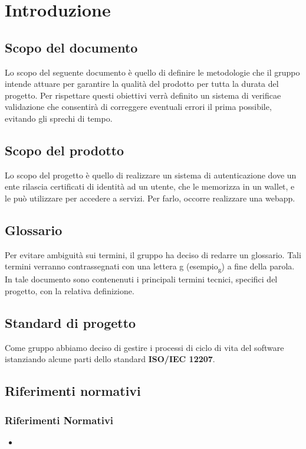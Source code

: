 \section{Introduzione}
\subsection{Scopo del documento}
Lo scopo del seguente documento è quello di definire le metodologie che il gruppo intende attuare per garantire la qualità del prodotto per tutta la durata del progetto.
Per rispettare questi obiettivi verrà definito un sistema di verifica\glo e validazione che consentirà di correggere eventuali errori il prima possibile, evitando gli sprechi di tempo.
\subsection{Scopo del prodotto} %
Lo scopo del progetto è quello di realizzare un sistema di autenticazione dove un ente rilascia
certificati di identità ad un utente, che le memorizza in un wallet\glo, e le può utilizzare
per accedere a servizi. Per farlo, occorre realizzare una webapp.
\subsection{Glossario}
Per evitare ambiguità sui termini, il gruppo ha deciso di redarre un glossario. Tali termini verranno contrassegnati con una lettera g (esempio\textsubscript{g}) a fine della parola. In tale documento sono contenenuti i principali termini tecnici, specifici del progetto, con la relativa definizione.
\subsection{Standard di progetto}
Come gruppo abbiamo deciso di gestire i processi di ciclo di vita del software istanziando alcune parti dello standard \textbf{ISO/IEC 12207}.
\subsection{Riferimenti normativi}%
\subsubsection{Riferimenti Normativi}
\begin{itemize}
    \item \NdPdocumento
\end{itemize}

